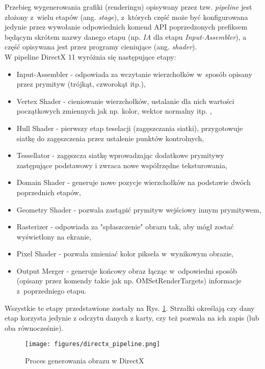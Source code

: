 Przebieg wygenerowania grafiki (renderingu) opisywany przez tzw. \emph{pipeline} jest złożony z~wielu etapów (ang. \emph{stage}), z~których część może być konfigurowana jedynie przez wywołanie odpowiednich komend API poprzedzonych prefiksem będącym skrótem nazwy danego etapu (np. \emph{IA} dla etapu \emph{Input-Assembler}), a część opisywana jest przez programy cieniujące (ang. \emph{shader}).\\
W pipeline DirectX 11 wyróżnia się następujące etapy:
\begin{itemize}
\item Input-Assembler - odpowiada za wczytanie wierzchołków w~sposób opisany przez prymityw (trójkąt, czworokąt itp.),
\item Vertex Shader - cieniowanie wierzchołków, ustalanie dla nich wartości początkowych zmiennych jak np. kolor, wektor normalny itp. ,
\item Hull Shader - pierwszy etap teselacji (zagęszczania siatki), przygotowuje siatkę do zagęszczenia przez ustalenie punktów kontrolnych,
\item Tessellator - zagęszcza siatkę wprowadzając dodatkowe prymitywy zastępujące podstawowy i zwraca nowe współrzędne teksturowania,
\item Domain Shader - generuje nowe pozycje wierzchołków na podstawie dwóch poprzednich etapów,
\item Geometry Shader - pozwala zastąpić prymityw wejściowy innym prymitywem,
\item Rasterizer - odpowiada za "spłaszczenie" obrazu tak, aby mógł zostać wyświetlony na ekranie,
\item Pixel Shader - pozwala zmieniać kolor piksela w~wynikowym obrazie,
\item Output Merger - generuje końcowy obraz łącząc w~odpowiedni sposób (opisany przez komendy takie jak np. OMSetRenderTargets) informacje z~poprzedniego etapu.
\end{itemize}

Wszystkie te etapy przedstawione zostały na Rys. \ref{directx_pipeline}. Strzałki określają czy dany etap korzysta jedynie z odczytu danych z karty, czy też pozwala na ich zapis (lub oba równocześnie).

\begin{figure}
\begin{center}
\texttt{[image: figures/directx\_pipeline.png]}
\caption{Proces generowania obrazu w DirectX}
\label{directx_pipeline}
\end{center}
\end{figure}

